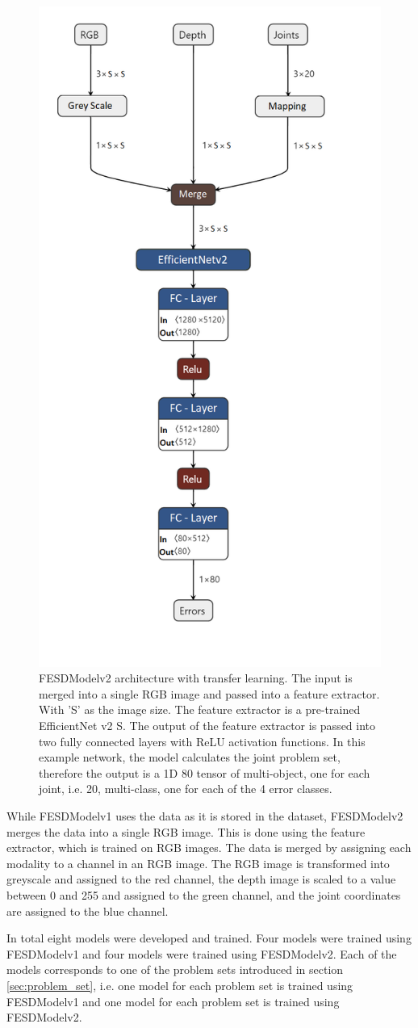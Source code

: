 \begin{figure}[ht]
  \centering
  \includegraphics[width=.5\linewidth]{figures/Model/FESDv2.png}
  \caption[FESDModel architecture version 2]{FESDModelv2 architecture with transfer learning. The input is merged into a single RGB image and passed into a feature extractor. With 'S' as the image size. The feature extractor is a pre-trained EfficientNet v2 S. The output of the feature extractor is passed into two fully connected layers with ReLU activation functions. In this example network, the model calculates the joint problem set, therefore the output is a 1D 80 tensor of multi-object, one for each joint, i.e. 20, multi-class, one for each of the 4 error classes.}
  \label{fig:model_architecture_v2}
\end{figure}

While FESDModelv1 uses the data as it is stored in the dataset, FESDModelv2 merges the data into a single RGB image. This is done using the feature extractor, which is trained on RGB images. The data is merged by assigning each modality to a channel in an RGB image. The RGB image is transformed into greyscale and assigned to the red channel, the depth image is scaled to a value between 0 and 255 and assigned to the green channel, and the joint coordinates are assigned to the blue channel.

In total eight models were developed and trained. Four models were trained using FESDModelv1 and four models were trained using FESDModelv2. Each of the models corresponds to one of the problem sets introduced in section \ref{sec:problem_set}, i.e. one model for each problem set is trained using FESDModelv1 and one model for each problem set is trained using FESDModelv2.

